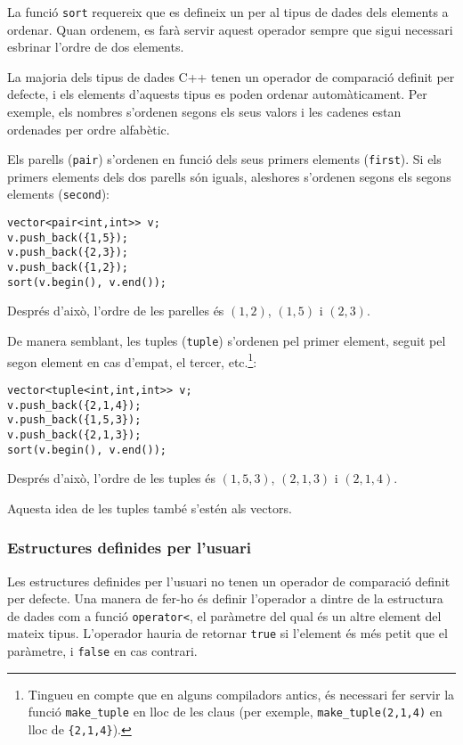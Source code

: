 
La funció \texttt{sort} requereix
que es defineix un  per al tipus de dades
dels elements a ordenar.
Quan ordenem, es farà servir aquest operador
sempre que sigui necessari esbrinar l'ordre de dos elements.

La majoria dels tipus de dades C++ tenen un operador de comparació definit
per defecte, i els elements d'aquests tipus es poden ordenar automàticament.
Per exemple, els nombres s'ordenen segons els seus valors i
les cadenes estan ordenades per ordre alfabètic.


Els parells (\texttt{pair}) s'ordenen en funció dels seus
primers elements (\texttt{first}).
Si els primers elements dels dos parells són iguals,
aleshores s'ordenen segons els segons elements (\texttt{second}):
\begin{lstlisting}
vector<pair<int,int>> v;
v.push_back({1,5});
v.push_back({2,3});
v.push_back({1,2});
sort(v.begin(), v.end());
\end{lstlisting}
Després d'això, l'ordre de les parelles és
$(1,2)$, $(1,5)$ i $(2,3)$.


De manera semblant, les tuples (\texttt{tuple})
s'ordenen pel primer element,
seguit pel segon element en cas d'empat, el tercer, etc.\footnote{
Tingueu en compte que en alguns compiladors antics,
és necessari fer servir la funció \texttt{make\_tuple} en lloc de les
claus (per exemple, \texttt{make\_tuple(2,1,4)} en lloc de \texttt{\{2,1,4\}}).}:
\begin{lstlisting}
vector<tuple<int,int,int>> v;
v.push_back({2,1,4});
v.push_back({1,5,3});
v.push_back({2,1,3});
sort(v.begin(), v.end());
\end{lstlisting}
Després d'això, l'ordre de les tuples és
$(1,5,3)$, $(2,1,3)$ i $(2,1,4)$.

Aquesta idea de les tuples també s'estén als vectors.

\subsubsection{Estructures definides per l'usuari}

Les estructures definides per l'usuari no tenen un
operador de comparació
definit per defecte.
Una manera de fer-ho és definir l'operador
a dintre de la estructura de dades com a funció
\texttt{operator<},
el paràmetre del qual és un altre element del mateix tipus.
L'operador hauria de retornar \texttt{true}
si l'element és més petit que el paràmetre,
i \texttt{false} en cas contrari.

